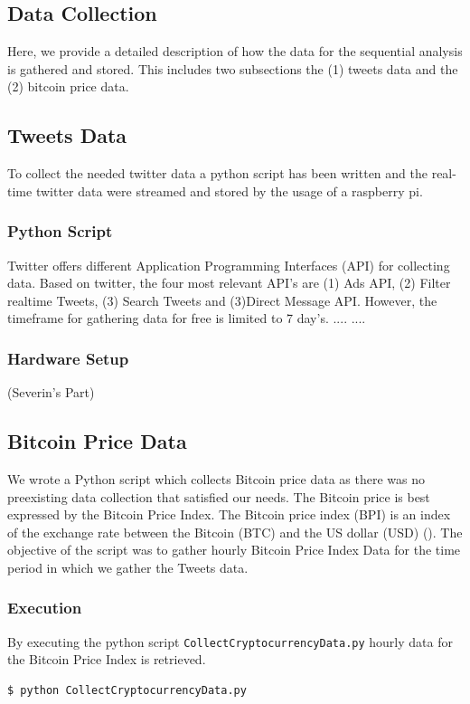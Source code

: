 \documentclass[a4paper,12pt]{article}
\begin{document}
\begin{spacing}{1.2}
\section{Data Collection}
Here, we provide a detailed description of how the data for the sequential analysis is gathered and stored. This includes two  subsections the (1) tweets data and the (2) bitcoin price data.
\subsection{Tweets Data}
To collect the needed twitter data a python script has been written and the real-time twitter data were streamed and stored by the usage of a raspberry pi.
\subsubsection{Python Script}
Twitter offers different Application Programming Interfaces (API) for collecting data. Based on twitter, the four most relevant API's are (1) Ads API, (2) Filter realtime Tweets, (3) Search Tweets and (3)Direct Message API. However, the timeframe for gathering data for free is limited to 7 day's.
....
....

\subsubsection{Hardware Setup}
(Severin's Part)

\subsection{Bitcoin Price Data}
We wrote a Python script which collects Bitcoin price data as there was no preexisting data collection that satisfied our needs. The Bitcoin price is best expressed by the Bitcoin Price Index. The Bitcoin price index (BPI) is an index of the exchange rate between the Bitcoin (BTC) and the US dollar (USD) (\cite{kristoufek2015main}). The objective of the script was to gather hourly Bitcoin Price Index Data for the time period in which we gather the Tweets data.
\subsubsection{Execution}
By executing the python script \verb|CollectCryptocurrencyData.py| hourly data for the Bitcoin Price Index is retrieved.
\begin{lstlisting}[language=bash]
    $ python CollectCryptocurrencyData.py
\end{lstlisting}


\end{spacing}
\end{document}
